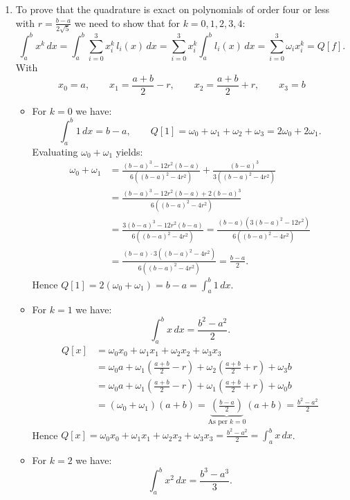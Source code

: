 \documentclass[]{article}
\begin{document}
\begin{enumerate}
\item To prove that the quadrature is exact on polynomials of order four or less with $r = \frac{b-a}{2\sqrt{5}}$ we need to show that for $k=0,1,2,3,4$:
\[
\int_a^b x^k\,dx
=\int_a^b \sum_{i=0}^3 x_i^k\,l_i(x)\,dx
=\sum_{i=0}^3 x_i^k \int_a^b l_i(x)\,dx
=\sum_{i=0}^3 \omega_i x_i^k = Q[f].
\]
With
\[
x_0=a,\qquad x_1=\frac{a+b}{2}-r,\qquad x_2=\frac{a+b}{2}+r,\qquad x_3=b
\]
\begin{itemize}
    \item 
    For $k=0$ we have:
\[
\int_a^b 1\,dx=b-a,
\qquad
Q[1]=\omega_0+\omega_1+\omega_2+\omega_3=2\omega_0+2\omega_1.
\]
Evaluating $\omega_0+\omega_1$ yields:
\begin{align*}
\omega_0+\omega_1
&=\frac{(b-a)^3-12r^2(b-a)}{6\left((b-a)^2-4r^2\right)}
  +\frac{(b-a)^3}{3\left((b-a)^2-4r^2\right)}\\
&=\frac{(b-a)^3-12r^2(b-a)+2(b-a)^3}{6\left((b-a)^2-4r^2\right)}\\
&=\frac{3(b-a)^3-12r^2(b-a)}{6\left((b-a)^2-4r^2\right)}
=\frac{(b-a)\left(3(b-a)^2-12r^2\right)}{6\left((b-a)^2-4r^2\right)}\\
&=\frac{(b-a)\cdot 3\left((b-a)^2-4r^2\right)}{6\left((b-a)^2-4r^2\right)}
=\frac{b-a}{2}.
\end{align*}
Hence \(Q[1]=2(\omega_0+\omega_1)=b-a=\int_a^b 1\,dx\).\newline 
\item For $k=1$ we have:
\[
\int_a^b x\,dx=\frac{b^2-a^2}{2}.
\]
\begin{align*}
Q[x] &= \omega_0x_0 + \omega_1x_1 + \omega_2x_2+\omega_3x_3 \\ 
&=\omega_0 a+\omega_1\left(\frac{a+b}{2}-r\right)+\omega_2\left(\frac{a+b}{2}+r\right)+\omega_3 b\\
&=\omega_0 a+\omega_1\left(\frac{a+b}{2}-r\right)+\omega_1\left(\frac{a+b}{2}+r\right)+\omega_0 b\\
&=(\omega_0+\omega_1)(a+b)
=\underbrace{\left(\frac{b-a}{2}\right)}_{\text{As per $k=0$}}(a+b)
=\frac{b^2-a^2}{2}
\end{align*}
Hence \(Q[x]= \omega_0x_0 + \omega_1x_1 + \omega_2x_2+\omega_3x_3=\frac{b^2-a^2}{2}=\int_a^b x\,dx\).\newline

\item For $k=2$ we have:
\[
\int_a^b x^2\,dx=\frac{b^3-a^3}{3}.
\]


\end{itemize}
\end{enumerate}
\end{document}

